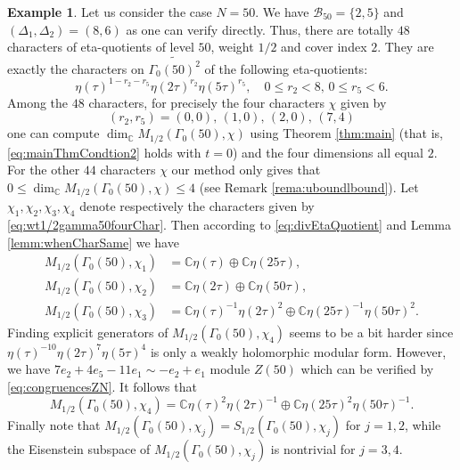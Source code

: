 \documentclass[12pt]{amsart}
\numberwithin{equation}{section}
\theoremstyle{plain}
\theoremstyle{definition}
\newtheorem{examp}[thm]{Example}
\theoremstyle{remark}
\newcommand\numC{\mathbb{C}}
\newcommand\Dcover[2]{\widetilde{#1^{#2}}}
\begin{document}
\begin{examp}
Let us consider the case $N=50$. We have $\mathscr{B}_{50}=\{2,5\}$ and $(\Delta_1,\Delta_2)=(8,6)$ as one can verify directly. Thus, there are totally $48$ characters of eta-quotients of level $50$, weight $1/2$ and cover index $2$. They are exactly the characters on $\Dcover{\Gamma_0(50)}{2}$ of the following eta-quotients:
\begin{equation*}
\eta(\tau)^{1-r_2-r_5}\eta(2\tau)^{r_2}\eta(5\tau)^{r_5},\quad 0\leq r_2<8,\,0\leq r_5<6.
\end{equation*}
Among the $48$ characters, for precisely the four characters $\chi$ given by
\begin{equation}
\label{eq:wt1/2gamma50fourChar}
(r_2,r_5)=(0,0),\,(1,0),\,(2,0),\,(7,4)
\end{equation}
one can compute $\dim_\numC M_{1/2}(\Gamma_0(50),\chi)$ using Theorem \ref{thm:main} (that is, \eqref{eq:mainThmCondtion2} holds with $t=0$) and the four dimensions all equal $2$. For the other $44$ characters $\chi$ our method only gives that $0\leq\dim_\numC M_{1/2}(\Gamma_0(50),\chi)\leq4$ (see Remark \ref{rema:uboundlbound}). Let $\chi_1,\chi_2,\chi_3,\chi_4$ denote respectively the characters given by \eqref{eq:wt1/2gamma50fourChar}. Then according to \eqref{eq:divEtaQuotient} and Lemma \ref{lemm:whenCharSame} we have
\begin{align*}
M_{1/2}(\Gamma_0(50),\chi_1)&=\numC\eta(\tau)\oplus\numC\eta(25\tau),\\
M_{1/2}(\Gamma_0(50),\chi_2)&=\numC\eta(2\tau)\oplus\numC\eta(50\tau),\\
M_{1/2}(\Gamma_0(50),\chi_3)&=\numC\eta(\tau)^{-1}\eta(2\tau)^2\oplus\numC\eta(25\tau)^{-1}\eta(50\tau)^{2}.
\end{align*}
Finding explicit generators of $M_{1/2}(\Gamma_0(50),\chi_4)$ seems to be a bit harder since $\eta(\tau)^{-10}\eta(2\tau)^7\eta(5\tau)^4$ is only a weakly holomorphic modular form. However, we have $7e_2+4e_5-11e_1\sim-e_2+e_1$ module $Z(50)$ which can be verified by \eqref{eq:congruencesZN}. It follows that
\begin{equation*}
M_{1/2}(\Gamma_0(50),\chi_4)=\numC\eta(\tau)^{2}\eta(2\tau)^{-1}\oplus\numC\eta(25\tau)^{2}\eta(50\tau)^{-1}.
\end{equation*}
Finally note that $M_{1/2}(\Gamma_0(50),\chi_j)=S_{1/2}(\Gamma_0(50),\chi_j)$ for $j=1,2$, while the Eisenstein subspace of $M_{1/2}(\Gamma_0(50),\chi_j)$ is nontrivial for $j=3,4$.
\end{examp}
\end{document}
